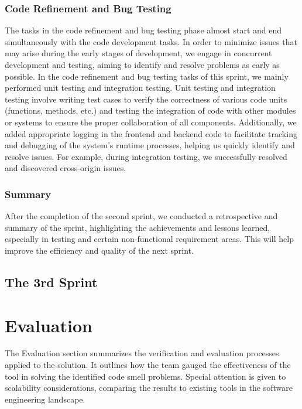 \documentclass[journal]{IEEEtran}
\begin{document}
\subsubsection{Code Refinement and Bug Testing}
The tasks in the code refinement and bug testing phase almost start and end simultaneously with the code development tasks. In order to minimize issues that may arise during the early stages of development, we engage in concurrent development and testing, aiming to identify and resolve problems as early as possible. In the code refinement and bug testing tasks of this sprint, we mainly performed unit testing and integration testing. Unit testing and integration testing involve writing test cases to verify the correctness of various code units (functions, methods, etc.) and testing the integration of code with other modules or systems to ensure the proper collaboration of all components. Additionally, we added appropriate logging in the frontend and backend code to facilitate tracking and debugging of the system's runtime processes, helping us quickly identify and resolve issues. For example, during integration testing, we successfully resolved and discovered cross-origin issues.

\subsubsection{Summary}
After the completion of the second sprint, we conducted a retrospective and summary of the sprint, highlighting the achievements and lessons learned, especially in testing and certain non-functional requirement areas. This will help improve the efficiency and quality of the next sprint.

\subsection{The 3rd Sprint}\label{sec:sprint3}


\section{Evaluation}
\noindent The Evaluation section summarizes the verification and evaluation processes applied to the solution. It outlines how the team gauged the effectiveness of the tool in solving the identified code smell problems. Special attention is given to scalability considerations, comparing the results to existing tools in the software engineering landscape.
\end{document}
